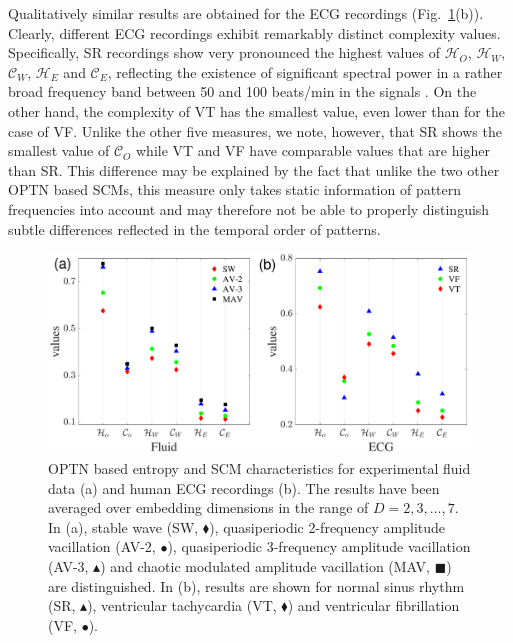\documentclass[12pt,aip,cha,reprint,nofootinbib]{revtex4-1}
\begin{document}
Qualitatively similar results are obtained for the ECG recordings (Fig.~\ref{fig:fluid}(b)). Clearly, different ECG recordings exhibit remarkably distinct complexity values. Specifically, SR recordings show very pronounced the highest values of $\mathcal{H}_O$, $\mathcal{H}_W$, $\mathcal{C}_W$, $\mathcal{H}_E$ and $\mathcal{C}_E$, reflecting the existence of significant spectral power in a rather broad frequency band between 50 and 100 beats/min in the signals \cite{smallCSF2002}. On the other hand, the complexity of VT has the smallest value, even lower than for the case of VF. Unlike the other five measures, we note, however, that SR shows the smallest value of $\mathcal{C}_O$ while VT and VF have comparable values that are higher than SR. This difference may be explained by the fact that unlike the two other OPTN based SCMs, this measure only takes static information of pattern frequencies into account and may therefore not be able to properly distinguish subtle differences reflected in the temporal order of patterns.

\begin{figure}
	\centering 
	\includegraphics[width=2\columnwidth]{fluidExample.pdf}
\caption{\small{OPTN based entropy and SCM characteristics for experimental fluid data (a) and human ECG recordings (b). The results have been averaged over embedding dimensions in the range of $D = 2, 3, \ldots, 7$. In (a), stable wave (SW, $\blacklozenge$), quasiperiodic 2-frequency amplitude vacillation (AV-2, $\bullet$), quasiperiodic 3-frequency amplitude vacillation (AV-3, $\blacktriangle$) and chaotic modulated amplitude vacillation (MAV, $\blacksquare$) are distinguished. In (b), results are shown for normal sinus rhythm (SR, $\blacktriangle$), ventricular tachycardia (VT, $\blacklozenge$) and ventricular fibrillation (VF, $\bullet$). } \label{fig:fluid}}
\end{figure}
\end{document}
